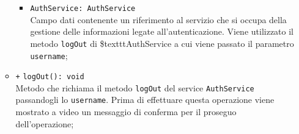 \begin{itemize}
\begin{itemize}
\begin{itemize}
			\item \texttt{AuthService: AuthService} \\
			Campo dati contenente un riferimento al servizio che si occupa della gestione delle informazioni legate all’autenticazione.  Viene utilizzato il metodo \texttt{logOut} di \$texttt{AuthService} a cui viene passato il parametro \texttt{username};
		\end{itemize}
		\item \texttt{+} \texttt{logOut(): void} \\
		Metodo che richiama il metodo \texttt{logOut} del service \texttt{AuthService} passandogli lo \texttt{username}. Prima di effettuare questa operazione viene mostrato a video un messaggio di conferma per il proseguo dell'operazione;
	\end{itemize}
\end{itemize}

